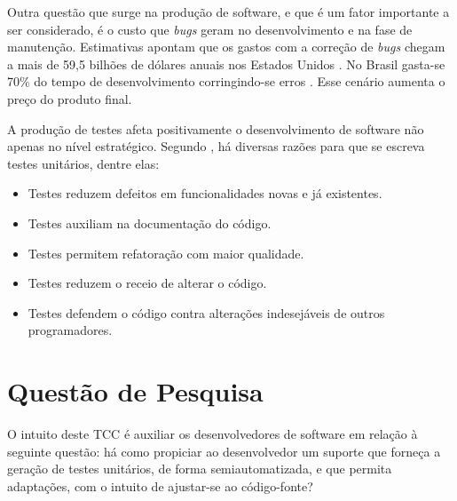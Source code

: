   \par
  \indent Outra questão que surge na produção de software, e que é um fator importante a ser considerado, é o custo que \textit{bugs} geram no desenvolvimento e na fase de manutenção. Estimativas apontam que os gastos com a correção de \textit{bugs} chegam a mais de 59,5 bilhões de dólares anuais nos Estados Unidos \cite{jantti2008}. No Brasil gasta-se 70\% do tempo de desenvolvimento corringindo-se erros \cite{janones2010}. Esse cenário aumenta o preço do produto final.
  \par
  \indent A produção de testes afeta positivamente o desenvolvimento de software não apenas no nível estratégico. Segundo , há diversas razões para que se escreva testes unitários, dentre elas:
  \begin{itemize}
    \item Testes reduzem defeitos em funcionalidades novas e já existentes.
    \item Testes auxiliam na documentação do código.
    \item Testes permitem refatoração com maior qualidade.
    \item Testes reduzem o receio de alterar o código.
    \item Testes defendem o código contra alterações indesejáveis de outros programadores.
  \end{itemize}

 \section{Questão de Pesquisa}
O intuito deste TCC é auxiliar os desenvolvedores de software em relação à seguinte questão: há como propiciar ao desenvolvedor um suporte que forneça a geração de testes unitários, de forma semiautomatizada, e que permita adaptações, com o intuito de ajustar-se ao código-fonte?

